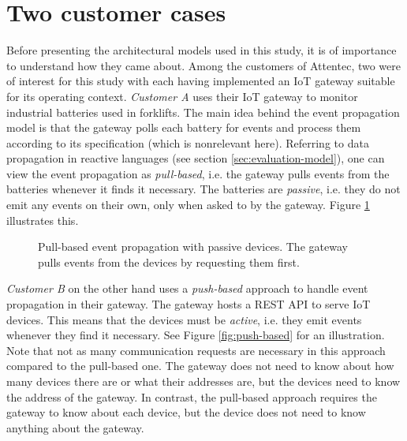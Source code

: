 \section{Two customer cases}
\label{sec:customer-cases}

Before presenting the architectural models used in this study, it is of
importance to understand how they came about. Among the customers of Attentec,
two were of interest for this study with each having implemented an IoT gateway
suitable for its operating context. \textit{Customer A} uses their IoT gateway
to monitor industrial batteries used in forklifts. The main idea behind the
event propagation model is that the gateway polls each battery for events and
process them according to its specification (which is nonrelevant here).
Referring to data propagation in reactive languages (see section
\ref{sec:evaluation-model}), one can view the event propagation as
\textit{pull-based}, i.e. the gateway pulls events from the batteries whenever
it finds it necessary. The batteries are \textit{passive}, i.e. they do not
emit any events on their own, only when asked to by the gateway. Figure
\ref{fig:pull-based} illustrates this.

\begin{figure}[h!]
    \centering
    \caption[Pull-based event propagation.]{Pull-based event propagation with
    passive devices. The gateway pulls events from the devices by requesting
    them first.}
    \label{fig:pull-based}
\end{figure}

\textit{Customer B} on the other hand uses a \textit{push-based} approach to
handle event propagation in their gateway. The gateway hosts a REST API to
serve IoT devices. This means that the devices must be \textit{active}, i.e.
they emit events whenever they find it necessary. See Figure
\ref{fig:push-based} for an illustration. Note that not as many communication
requests are necessary in this approach compared to the pull-based one. The
gateway does not need to know about how many devices there are or what their
addresses are, but the devices need to know the address of the gateway. In
contrast, the pull-based approach requires the gateway to know about each
device, but the device does not need to know anything about the gateway.

